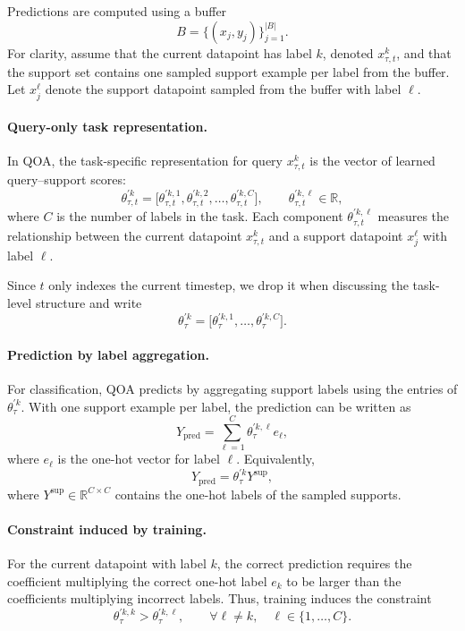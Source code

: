 \documentclass{article}
\begin{document}
Predictions are computed using a buffer
\[
B=\{(x_j,y_j)\}_{j=1}^{|B|}.
\]
For clarity, assume that the current datapoint has label $k$, denoted $x_{\tau,t}^{k}$, and that the support set contains one sampled support example per label from the buffer. Let $x_j^\ell$ denote the support datapoint sampled from the buffer with label $\ell$.

\paragraph{Query-only task representation.}
In QOA, the task-specific representation for query $x_{\tau,t}^{k}$ is the vector of learned query--support scores:
\begin{equation}
\theta_{\tau,t}^{\prime k}
=
\Big[
\theta_{\tau,t}^{\prime k,1},
\theta_{\tau,t}^{\prime k,2},
\dots,
\theta_{\tau,t}^{\prime k,C}
\Big],
\qquad
\theta_{\tau,t}^{\prime k,\ell}\in\mathbb{R},
\end{equation}
where $C$ is the number of labels in the task. Each component $\theta_{\tau,t}^{\prime k,\ell}$ measures the relationship between the current datapoint $x_{\tau,t}^{k}$ and a support datapoint $x_j^\ell$ with label $\ell$.

Since $t$ only indexes the current timestep, we drop it when discussing the task-level structure and write
\[
\theta_{\tau}^{\prime k}
=
\Big[
\theta_{\tau}^{\prime k,1},
\dots,
\theta_{\tau}^{\prime k,C}
\Big].
\]

\paragraph{Prediction by label aggregation.}
For classification, QOA predicts by aggregating support labels using the entries of $\theta_{\tau}^{\prime k}$. With one support example per label, the prediction can be written as
\begin{equation}
Y_{\mathrm{pred}}
=
\sum_{\ell=1}^{C}
\theta_{\tau}^{\prime k,\ell} e_\ell,
\end{equation}
where $e_\ell$ is the one-hot vector for label $\ell$. Equivalently,
\begin{equation}
Y_{\mathrm{pred}}
=
\theta_{\tau}^{\prime k} Y^{\mathrm{sup}},
\end{equation}
where $Y^{\mathrm{sup}}\in\mathbb{R}^{C\times C}$ contains the one-hot labels of the sampled supports.

\paragraph{Constraint induced by training.}
For the current datapoint with label $k$, the correct prediction requires the coefficient multiplying the correct one-hot label $e_k$ to be larger than the coefficients multiplying incorrect labels. Thus, training induces the constraint
\begin{equation}
\theta_{\tau}^{\prime k,k}
>
\theta_{\tau}^{\prime k,\ell},
\qquad
\forall \ell\neq k,\quad \ell\in\{1,\dots,C\}.
\end{equation}
\end{document}
